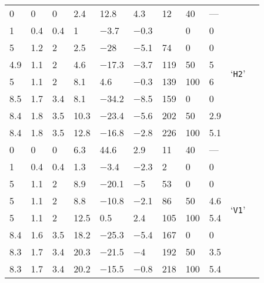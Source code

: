 \begin{longtable}{llll llll lll}
	 \hdashline
	\num{0} & \num{0} &  \num{0} & \num{2.4} & \num{12.8} & \num{4.3} & \num{12} & 40 & --- & \multirow{8}{*}{`\texttt{H2}'} \\*
	\num{1} & \num{.4} & \num{.4} & \num{1} & \num{-3.7} & \num{-.3} & \echaf{\num{-.9}} & \num{0} & \num{0} & \\*
	\num{5} & \num{1.2} & \num{2} & \num{2.5} & \num{-28} & \num{-5.1} & \num{74} & \num{0} & \num{0} & \\*
	\num{4.9} & \num{1.1} &  \num{2} & \num{4.6} & \num{-17.3} & \num{-3.7} & \num{119} & \num{50} & \num{5} & \\*
	\num{5} & \num{1.1} &  \num{2} & \num{8.1} & \num{4.6} & \num{-.3} & \num{139} & \num{100} & \num{6} & \\*
	\num{8.5} & \num{1.7} & \num{3.4} & \num{8.1} & \num{-34.2} & \num{-8.5} & \num{159} & \num{0} & \num{0} & \\*
	\num{8.4} & \num{1.8} &  \num{3.5} & \num{10.3} & \num{-23.4} & \num{-5.6} & \num{202} & \num{50} & \num{2.9} & \\*
	\num{8.4} & \num{1.8} &  \num{3.5} & \num{12.8} & \num{-16.8} & \num{-2.8} & \num{226} & \num{100} & \num{5.1} & \\
	
	 \hdashline
	\num{0} & \num{0} & \num{0} & \num{6.3} & \num{44.6} & \num{2.9} & \num{11} & \num{40} & --- & \multirow{8}{*}{`\texttt{V1}'} \\*
	\num{1} & \num{.4} & \num{.4} & \num{1.3} & \num{-3.4} & \num{-2.3} & \num{2} & \num{0} & \num{0} & \\*
	\num{5} & \num{1.1} & \num{2} & \num{8.9} & \num{-20.1} & \num{-5} & \num{53} & \num{0} & \num{0} & \\*
	\num{5} & \num{1.1} & \num{2} & \num{8.8} & \num{-10.8} & \num{-2.1} & \num{86} & \num{50} & \num{4.6} & \\*
	\num{5} & \num{1.1} & \num{2} & \num{12.5} & \num{.5} & \num{2.4} & \num{105} & \num{100} & \num{5.4} & \\*
	\num{8.4} & \num{1.6} & \num{3.5} & \num{18.2} & \num{-25.3} & \num{-5.4} & \num{167} & \num{0} & \num{0} & \\*
	\num{8.3} & \num{1.7} & \num{3.4} & \num{20.3} & \num{-21.5} & \num{-4} & \num{192} & \num{50} & \num{3.5} & \\*
	\num{8.3} & \num{1.7} & \num{3.4} & \num{20.2} & \num{-15.5} & \num{-.8} & \num{218} & \num{100} & \num{5.4} & \\
	

\end{longtable}
